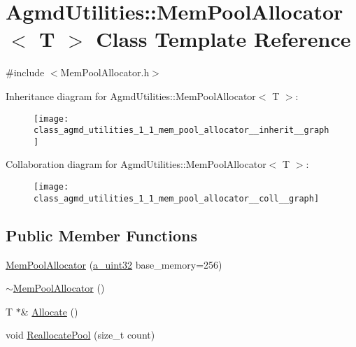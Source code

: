 \hypertarget{class_agmd_utilities_1_1_mem_pool_allocator}{\section{Agmd\+Utilities\+:\+:Mem\+Pool\+Allocator$<$ T $>$ Class Template Reference}
\label{class_agmd_utilities_1_1_mem_pool_allocator}
}


{\ttfamily \#include $<$Mem\+Pool\+Allocator.\+h$>$}



Inheritance diagram for Agmd\+Utilities\+:\+:Mem\+Pool\+Allocator$<$ T $>$\+:
\nopagebreak
\begin{figure}[H]
\begin{center}
\leavevmode
\texttt{[image: class\_agmd\_utilities\_1\_1\_mem\_pool\_allocator\_\_inherit\_\_graph]}
\end{center}
\end{figure}


Collaboration diagram for Agmd\+Utilities\+:\+:Mem\+Pool\+Allocator$<$ T $>$\+:
\nopagebreak
\begin{figure}[H]
\begin{center}
\leavevmode
\texttt{[image: class\_agmd\_utilities\_1\_1\_mem\_pool\_allocator\_\_coll\_\_graph]}
\end{center}
\end{figure}
\subsection*{Public Member Functions}
\begin{DoxyCompactItemize}
\item 
\hyperlink{class_agmd_utilities_1_1_mem_pool_allocator_aaa795d493ff1ba1d62841341f87aeed8}{Mem\+Pool\+Allocator} (\hyperlink{_common_defines_8h_a964296f9770051b9e4807b1f180dd416}{a\+\_\+uint32} base\+\_\+memory=256)
\item 
\hyperlink{class_agmd_utilities_1_1_mem_pool_allocator_a71326f3c70abd848e9f79e63c007619f}{$\sim$\+Mem\+Pool\+Allocator} ()
\item 
T $\ast$\& \hyperlink{class_agmd_utilities_1_1_mem_pool_allocator_ae49e592ec0a90978ac4cc83b322bf6ef}{Allocate} ()
\item 
void \hyperlink{class_agmd_utilities_1_1_mem_pool_allocator_aad3697dcce25fd5064aac51e01032bf2}{Reallocate\+Pool} (size\+\_\+t count)
\end{DoxyCompactItemize}


